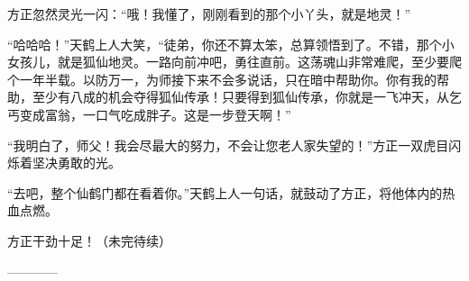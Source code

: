 \begin{this_body}
方正忽然灵光一闪：“哦！我懂了，刚刚看到的那个小丫头，就是地灵！”

“哈哈哈！”天鹤上人大笑，“徒弟，你还不算太笨，总算领悟到了。不错，那个小女孩儿，就是狐仙地灵。一路向前冲吧，勇往直前。这荡魂山非常难爬，至少要爬个一年半载。以防万一，为师接下来不会多说话，只在暗中帮助你。你有我的帮助，至少有八成的机会夺得狐仙传承！只要得到狐仙传承，你就是一飞冲天，从乞丐变成富翁，一口气吃成胖子。这是一步登天啊！”

“我明白了，师父！我会尽最大的努力，不会让您老人家失望的！”方正一双虎目闪烁着坚决勇敢的光。

“去吧，整个仙鹤门都在看着你。”天鹤上人一句话，就鼓动了方正，将他体内的热血点燃。

方正干劲十足！（未完待续）

------------

\end{this_body}

